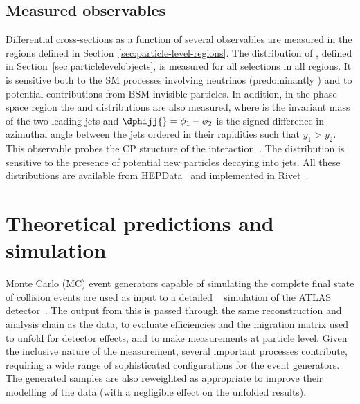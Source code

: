 \documentclass[atlasdraft=false, cernpreprint, UKenglish, texmf, orcidlogo]{atlasdoc}
\begin{document}
 
\subsection{Measured observables}
\label{sec:particle-level-variables}
 
Differential cross-sections as a function of several observables are measured in the regions defined in Section~\ref{sec:particle-level-regions}.
The distribution of \ptrec, defined in Section~\ref{sec:particlelevelobjects}, is measured for all selections in all regions.
It is sensitive
both to the SM processes involving neutrinos (predominantly \Znunu) and to potential contributions
from BSM invisible particles.
In addition, in the \vbf phase-space region the \mjj and \dphijj distributions are also measured, where \mjj is the invariant mass of the two leading jets and
$\dphijj{} = \phi_{1} - \phi_{2}$ is the signed difference in azimuthal angle between the jets ordered in their rapidities such that $y_1 > y_2$.
This observable probes the CP structure of the \vbf{} interaction~\cite{Bernlochner:2018opw}.
The \mjj distribution is sensitive to the presence of potential new particles decaying into jets.
All these distributions are available from HEPData~\cite{Maguire:2017ypu} and implemented in Rivet~\cite{Bierlich:2019rhm}.


 

\section{Theoretical predictions and simulation}
\label{sec:sim}
 
Monte Carlo (MC) event generators capable of simulating the complete final state of collision events are used as input to a detailed
\GEANT~\cite{Agostinelli:2002hh,Allison:2006ve} simulation of the
ATLAS detector~\cite{SOFT-2010-01}. The output from this is passed through the same reconstruction and analysis chain as the data,
to evaluate efficiencies and the
migration matrix used to unfold for detector effects, and to make measurements at particle level. Given the inclusive
nature of the measurement, several important processes contribute, requiring a wide range of sophisticated configurations
for the event generators. The generated samples are also reweighted as appropriate to improve their modelling of the data (with a negligible effect on the unfolded results).
 
\end{document}
